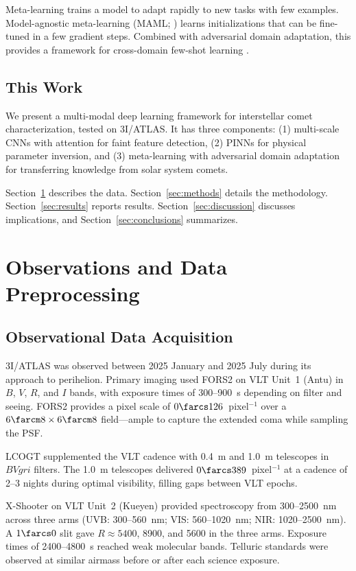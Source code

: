 \documentclass[preprint2]{aastex631}
\begin{document}
Meta-learning trains a model to adapt rapidly to new tasks with few examples. Model-agnostic meta-learning (MAML; \citealt{finn17}) learns initializations that can be fine-tuned in a few gradient steps. Combined with adversarial domain adaptation, this provides a framework for cross-domain few-shot learning \citep{li18}.

\subsection{This Work}

We present a multi-modal deep learning framework for interstellar comet characterization, tested on 3I/ATLAS. It has three components: (1) multi-scale CNNs with attention for faint feature detection, (2) PINNs for physical parameter inversion, and (3) meta-learning with adversarial domain adaptation for transferring knowledge from solar system comets.

Section~\ref{sec:obs} describes the data. Section~\ref{sec:methods} details the methodology. Section~\ref{sec:results} reports results. Section~\ref{sec:discussion} discusses implications, and Section~\ref{sec:conclusions} summarizes.

\section{Observations and Data Preprocessing}\label{sec:obs}

\subsection{Observational Data Acquisition}

3I/ATLAS was observed between 2025 January and 2025 July during its approach to perihelion. Primary imaging used FORS2 on VLT Unit~1 (Antu) in $B$, $V$, $R$, and $I$ bands, with exposure times of 300--900~s depending on filter and seeing. FORS2 provides a pixel scale of $0\farcs126$~pixel$^{-1}$ over a $6\farcm8 \times 6\farcm8$ field---ample to capture the extended coma while sampling the PSF.

LCOGT supplemented the VLT cadence with 0.4~m and 1.0~m telescopes in $BVgri$ filters. The 1.0~m telescopes delivered $0\farcs389$~pixel$^{-1}$ at a cadence of 2--3 nights during optimal visibility, filling gaps between VLT epochs.

X-Shooter on VLT Unit~2 (Kueyen) provided spectroscopy from 300--2500~nm across three arms (UVB: 300--560~nm; VIS: 560--1020~nm; NIR: 1020--2500~nm). A $1\farcs0$ slit gave $R \approx 5400$, 8900, and 5600 in the three arms. Exposure times of 2400--4800~s reached weak molecular bands. Telluric standards were observed at similar airmass before or after each science exposure.
\end{document}
